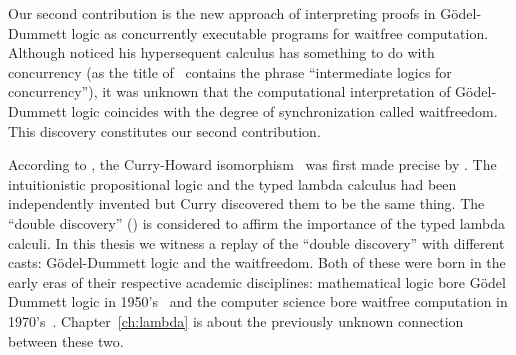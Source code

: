 Our second contribution is the new approach of interpreting proofs in
G\"odel-Dummett logic as
concurrently executable programs for waitfree computation.
Although \citet{avron91} noticed his hypersequent calculus has something
to do with concurrency (as the title of~\citep{avron91} contains the phrase
``intermediate logics for concurrency''), it was unknown that
the computational interpretation of G\"odel-Dummett logic coincides with
the degree of synchronization called waitfreedom.  This discovery
constitutes our second contribution.

According to \citet[p.97]{curryhoward},
the Curry-Howard isomorphism~\citep{curryhoward} was first made
precise by \citet[\textbf{9}E and
\textbf{9}F]{curry1974combinatory}.
The intuitionistic propositional logic and the typed lambda calculus
had been independently invented but Curry discovered them to be the same thing.
The ``double discovery'' (\citet{wadler2012propositions}) is considered
to affirm the importance of the typed lambda calculi.
In this thesis we witness a replay of the ``double discovery'' with
different casts: G\"odel-Dummett logic and the waitfreedom.
Both of these were born in the early eras of their respective academic
disciplines:
mathematical logic bore G\"odel Dummett logic in
1950's~\citep{dummett59}
and the computer science bore waitfree computation in
1970's~\citep{lamport1979make}.
Chapter~\ref{ch:lambda} is about the previously unknown connection
between these two.

